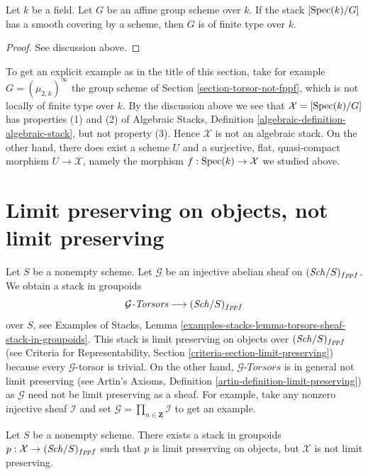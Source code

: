 \begin{lemma}
\label{lemma-BG-algebraic}
Let $k$ be a field. Let $G$ be an affine group scheme over $k$.
If the stack $[\mathop{\mathrm{Spec}}(k)/G]$ has a smooth covering by a
scheme, then $G$ is of finite type over $k$.
\end{lemma}

\begin{proof}
See discussion above.
\end{proof}

\noindent
To get an explicit example as in the title of this section, take for example
$G = (\mu_{2, k})^\infty$ the group scheme of
Section \ref{section-torsor-not-fppf}, which is not locally of finite type
over $k$. By the discussion above we see that
$\mathcal{X} = [\mathop{\mathrm{Spec}}(k)/G]$ has properties (1) and (2) of
Algebraic Stacks, Definition \ref{algebraic-definition-algebraic-stack},
but not property (3). Hence $\mathcal{X}$ is not an algebraic stack.
On the other hand, there does exist a scheme $U$ and a surjective,
flat, quasi-compact morphism $U \to \mathcal{X}$, namely the morphism
$f : \mathop{\mathrm{Spec}}(k) \to \mathcal{X}$ we studied above.






\section{Limit preserving on objects, not limit preserving}
\label{section-limit-preserving}

\noindent
Let $S$ be a nonempty scheme. Let $\mathcal{G}$ be an injective abelian sheaf
on $(\mathit{Sch}/S)_{fppf}$. We obtain a stack in groupoids
$$
\mathcal{G}\textit{-Torsors} \longrightarrow (\mathit{Sch}/S)_{fppf}
$$
over $S$, see Examples of Stacks, Lemma
\ref{examples-stacks-lemma-torsors-sheaf-stack-in-groupoids}.
This stack is limit preserving on objects over $(\mathit{Sch}/S)_{fppf}$ (see
Criteria for Representability, Section \ref{criteria-section-limit-preserving})
because every $\mathcal{G}$-torsor is trivial. On the other hand,
$\mathcal{G}\textit{-Torsors}$ is in general not limit preserving (see
Artin's Axioms, Definition \ref{artin-definition-limit-preserving})
as $\mathcal{G}$ need not be limit preserving as a sheaf. For example,
take any nonzero injective sheaf $\mathcal{I}$ and set
$\mathcal{G} = \prod_{n \in \mathbf{Z}} \mathcal{I}$ to get an
example.

\begin{lemma}
\label{lemma-limit-preserving-on-objects-not-limit-preserving}
Let $S$ be a nonempty scheme. There exists a stack in groupoids
$p : \mathcal{X} \to (\mathit{Sch}/S)_{fppf}$
such that $p$ is limit preserving on objects, but $\mathcal{X}$ is not
limit preserving.
\end{lemma}

